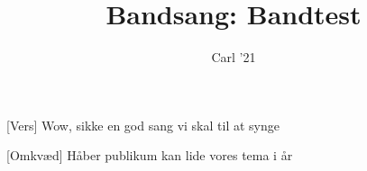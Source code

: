\documentclass[a4paper,11pt]{article}
\title{Bandsang: Bandtest}
\author{Carl '21}
\begin{document}
\maketitle

\begin{song}
[Vers] Wow, sikke en god sang vi skal til at synge

[Omkvæd] Håber publikum kan lide vores tema i år
\end{song}
\end{document}
